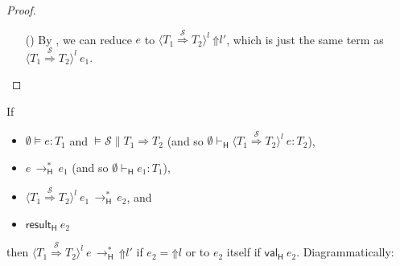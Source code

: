 \documentclass[9pt]{extarticle}
\newcommand{\ottnt}[1]{\mathit{#1}}
\newcommand{\ottsym}[1]{#1}
\begin{document}
{\begin{lemma}
\begin{proof}
{\begin{itemize}
    \item[(\E{CastRaise})] By , we can reduce $\ottnt{e}$ to
      $ \langle  \ottnt{T_{{\mathrm{1}}}}  \mathord{ \overset{ \mathcal{S} }{\Rightarrow} }  \ottnt{T_{{\mathrm{2}}}}  \rangle^{ \ottnt{l} } ~   \mathord{\Uparrow}  \ottnt{l'}  $, which is just the same term as
      $ \langle  \ottnt{T_{{\mathrm{1}}}}  \mathord{ \overset{ \mathcal{S} }{\Rightarrow} }  \ottnt{T_{{\mathrm{2}}}}  \rangle^{ \ottnt{l} } ~  \ottnt{e_{{\mathrm{1}}}} $.
    \end{itemize}
    \fi}
  \end{proof}
\end{lemma}

\begin{lemma}
  \label{lem:heedfulcastcongruence}
  If
  \begin{itemize}
  \item $\emptyset  \models  \ottnt{e}  \ottsym{:}  \ottnt{T_{{\mathrm{1}}}}$ and $\models  \mathcal{S}  \mathrel{\parallel}  \ottnt{T_{{\mathrm{1}}}}  \Rightarrow  \ottnt{T_{{\mathrm{2}}}}$ (and so
    $ \emptyset   \vdash _{  \mathsf{H}  }   \langle  \ottnt{T_{{\mathrm{1}}}}  \mathord{ \overset{ \mathcal{S} }{\Rightarrow} }  \ottnt{T_{{\mathrm{2}}}}  \rangle^{ \ottnt{l} } ~  \ottnt{e}   :  \ottnt{T_{{\mathrm{2}}}} $),
  \item $\ottnt{e} \,  \longrightarrow ^{*}_{  \mathsf{H}  }  \, \ottnt{e_{{\mathrm{1}}}}$ (and so $ \emptyset   \vdash _{  \mathsf{H}  }  \ottnt{e_{{\mathrm{1}}}}  :  \ottnt{T_{{\mathrm{1}}}} $),
  \item $ \langle  \ottnt{T_{{\mathrm{1}}}}  \mathord{ \overset{ \mathcal{S} }{\Rightarrow} }  \ottnt{T_{{\mathrm{2}}}}  \rangle^{ \ottnt{l} } ~  \ottnt{e_{{\mathrm{1}}}}  \,  \longrightarrow ^{*}_{  \mathsf{H}  }  \, \ottnt{e_{{\mathrm{2}}}}$, and
  \item $ \mathsf{result} _{  \mathsf{H}  }~ \ottnt{e_{{\mathrm{2}}}} $
  \end{itemize}
then $ \langle  \ottnt{T_{{\mathrm{1}}}}  \mathord{ \overset{ \mathcal{S} }{\Rightarrow} }  \ottnt{T_{{\mathrm{2}}}}  \rangle^{ \ottnt{l} } ~  \ottnt{e}  \,  \longrightarrow ^{*}_{  \mathsf{H}  }  \,  \mathord{\Uparrow}  \ottnt{l'} $ if $\ottnt{e_{{\mathrm{2}}}}  \ottsym{=}   \mathord{\Uparrow}  \ottnt{l} $ or
  to $\ottnt{e_{{\mathrm{2}}}}$ itself if $ \mathsf{val} _{  \mathsf{H}  }~ \ottnt{e_{{\mathrm{2}}}} $. Diagrammatically:
\begin{center}
\end{center}
\end{lemma}}
\end{document}
